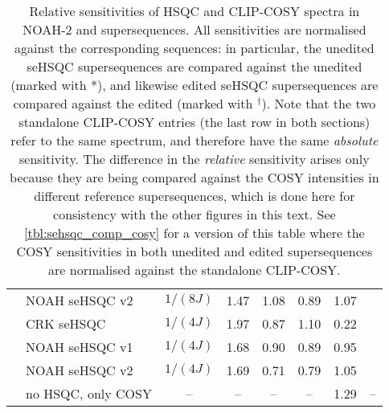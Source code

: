 {\begin{table}
\begin{tabular}{clcccccc}
         & NOAH seHSQC v2      & $1/(8J)$       & 1.47 & 1.08 & 0.89 & 1.07 & {fig:edited_sn_comp_spv2} \\
         & CRK seHSQC          & $1/(4J)$       & 1.97 & 0.87 & 1.10 & 0.22 & {fig:1_4j_edited_crk} \\
         & NOAH seHSQC v1      & $1/(4J)$       & 1.68 & 0.90 & 0.89 & 0.95 & {fig:1_4j_edited_spv1} \\
         & NOAH seHSQC v2      & $1/(4J)$       & 1.69 & 0.71 & 0.79 & 1.05 & {fig:1_4j_edited_spv2} \\
         & no HSQC, only COSY  & --             & --   & --   & --   & 1.29 & -- \\ 
        \bottomrule
    \end{tabular}
    \caption{
        Relative sensitivities of HSQC and CLIP-COSY spectra in NOAH-2  and  supersequences.
        All sensitivities are normalised against the corresponding  sequences: in particular, the unedited seHSQC supersequences are compared against the unedited  (marked with *), and likewise edited seHSQC supersequences are compared against the edited  (marked with $^\dagger$).
        Note that the two standalone CLIP-COSY entries (the last row in both sections) refer to the same spectrum, and therefore have the same \textit{absolute} sensitivity.
        The difference in the \textit{relative} sensitivity arises only because they are being compared against the COSY intensities in different reference supersequences, which is done here for consistency with the other figures in this text.
        See \cref{tbl:sehsqc_comp_cosy} for a version of this table where the COSY sensitivities in both unedited and edited supersequences are normalised against the standalone CLIP-COSY.
        \andro{}
    }
    \label{tbl:sehsqc_comp}
\end{table}
} %

